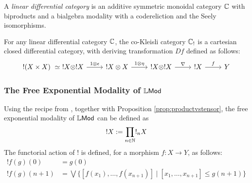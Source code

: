 \begin{definition}
A \emph{linear differential category} is an additive symmetric monoidal category $\mathbb{C}$ with biproducts and a bialgebra modality with a codereliction and the Seely isomorphisms.
\end{definition}


\begin{theorem}
For any linear differential category $\mathbb{C}$, the co-Kleisli category $\mathbb{C}_{!}$ is a cartesian closed differential category, with deriving transformation $Df$ defined as follows:
$$
\begin{tikzcd}
!(X\times X)\  \simeq\  !X\otimes !X 
\ar{r}{1\otimes \epsilon}  & !X\otimes X \ar{r}{1\otimes \eta}&
!X\otimes !X \ar{r}{\nabla}& !X \ar{r}{f} & Y
\end{tikzcd}
$$
\end{theorem}


\subsubsection{The Free Exponential Modality of $\mathbb{L}\mathsf{Mod}$}


Using the recipe from \cite{Mellies2018}, together with Proposition \ref{prop:productvstensor}, the free exponential modality of $\mathbb{L}\mathsf{Mod}$ can be defined as
$$
! X:= \prod_{n\in \mathbb{N}}!_{n}X
$$
The functorial action of $!$ is defined, for a morphism $f: X\to Y$, as follows:
\begin{align*}
!f(g)(0) & = g(0) \\
!f (g)(n+1)   & = \bigvee\Big \{
[f(x_{1}),\dots, f(x_{n+1})] \mid [x_{1}, \dots, x_{n+1}]\leq g(n+1)\Big \}
\end{align*}




